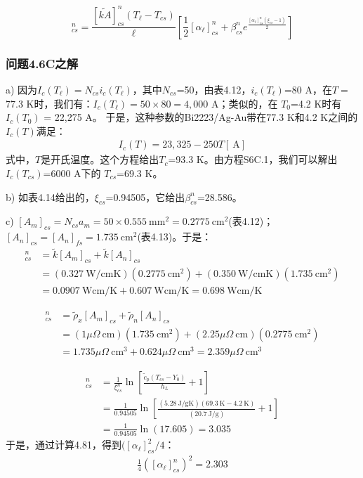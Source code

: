 \begin{equation}%
[Q_j]_{cs}^{n}=\frac{[\tilde{kA}]_{cs}^{n}(T_\ell-T_{cs})}{\ell}\left[\frac{1}{2}[\alpha_\ell]_{cs}^{n}+\beta_{cs}^{n}e^{\frac{[\alpha_\ell]_{cs}^{n}(\xi_{cs}-1)}{2}}\right]
\end{equation}

\subsubsection{问题4.6C之解}
a) 因为$I_c(T_\ell)=N_{cs}i_c(T_\ell)$，其中$N_{cs}$=50，由表4.12，$i_c(T_\ell)$=80 A，在$T=$77.3 K时，我们有：$I_c(T_\ell)= 50\times 80= 4,000$ A；类似的，在
$T_0$=4.2 K时有$I_c(T_0)$ = 22,275 A。
于是，这种参数的Bi2223/Ag-Au带在77.3 K和4.2 K之间的$I_c(T)$满足：
\begin{align*}
 I_c(T)=23,325-250T[\ \mathrm{A}] \tag{S6C.1}
\end{align*}
式中，$T$是开氏温度。这个方程给出$T_c$=93.3 K。由方程S6C.1，我们可以解出$I_c(T_{cs})$=6000 A下的
$T_{cs}$=69.3 K。

b) 如表4.14给出的，$\xi_{cs}$=0.94505，它给出$\beta_{cs}^n$=28.586。

c) $[A_m]_{cs}=N_{cs} a_m=50\times 0.555\ \mathrm{mm^2}=0.2775\ \mathrm{cm^2}$(表4.12)；
$[A_n]_{cs}=[A_n]_{fs}=1.735\ \mathrm{cm^2}$(表4.13)。于是：
\begin{align*}%
[\tilde{kA}]_{cs}^{n}&=\tilde{k}[A_m]_{cs}+\tilde{k}[A_n]_{cs} \\
&=(0.327\ \mathrm{W/cmK})(0.2775\ \mathrm{cm^2})+(0.350\ \mathrm{W/cmK})(1.735\ \mathrm{cm^2}) \\
&=0.0907\ \mathrm{W cm/K}+0.607\ \mathrm{W cm/K}=0.698\ \mathrm{W cm/K} \tag{4.79}
\end{align*}

\begin{align*}%
[\tilde{\rho A}]_{cs}^{n}&=\tilde{\rho}_x[A_m]_{cs}+\tilde{\rho}_n[A_n]_{cs} \\
&=(1\mu\Omega\ \mathrm{cm})(1.735\ \mathrm{cm^2})+(2.25\mu\Omega\ \mathrm{cm})(0.2775\ \mathrm{cm^2}) \\
&=1.735\mu\Omega\ \mathrm{cm^3}+0.624\mu\Omega\ \mathrm{cm^3}=2.359\mu\Omega\ \mathrm{cm^3} \tag{4.82}
\end{align*}

\begin{align*}%
[\alpha_\ell]_{cs}^{n}&=\frac{1}{\xi_{cs}^{n}}\ln\left[\frac{\tilde{c}_p(T_{cs}-Y_0)}{h_L}+1\right] \\
&=\frac{1}{0.94505}\ln\left[\frac{(5.28\ \mathrm{J/gK})(69.3\ \mathrm{K}-4.2\ \mathrm{K})}{(20.7\ \mathrm{J/g})}+1\right] \\
&=\frac{1}{0.94505}\ln(17.605)=3.035 \tag{4.80b}
\end{align*}
于是，通过计算4.81，得到$([\alpha_\ell]_{cs}^2/4$：
\begin{align*}
\frac{1}{4}([\alpha_\ell]_{cs}^{n})^2=2.303
\end{align*}

